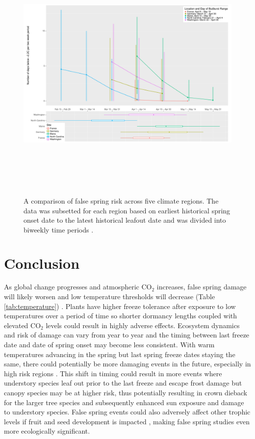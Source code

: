 \documentclass{article}\usepackage[]{graphicx}\usepackage[]{color}
\begin{document}
\begin{figure} [H] 
\begin{center}
\includegraphics[width=16cm, height=13cm]{..//figure/RegionalRisk.pdf} 
\caption{A comparison of false spring risk across five climate regions. The data was subsetted for each region based on earliest historical spring onset date to the latest historical leafout date and was divided into biweekly time periods \citep{Schaber2005, White2009, Soudani2012, USA-NPN2016}.}\label{fig:regional} 
\end{center}
\end{figure}

\section*{Conclusion}
As global change progresses and atmospheric CO$_{\text{2}}$ increases, false spring damage will likely worsen and low temperature thresholds will decrease (Table \ref{tab:temperature}) \citep{Beerling2001, Barker2005}. Plants have higher freeze tolerance after exposure to low temperatures over a period of time \citep{Thomashow1999} so shorter dormancy lengths coupled with elevated CO$_{\text{2}}$ levels could result in highly adverse effects. Ecosystem dynamics and risk of damage can vary from year to year and the timing between last freeze date and date of spring onset may become less consistent. With warm temperatures advancing in the spring but last spring freeze dates staying the same, there could potentially be more damaging events in the future, especially in high risk regions \citep{Gu2008, Inouye2008}. This shift in timing could result in more events where understory species leaf out prior to the last freeze and escape frost damage but canopy species may be at higher risk, thus potentially resulting in crown dieback for the larger tree species and subsequently enhanced sun exposure and damage to understory species. False spring events could also adversely affect other trophic levels if fruit and seed development is impacted \citep{Gu2008}, making false spring studies even more ecologically significant.
\end{document}
